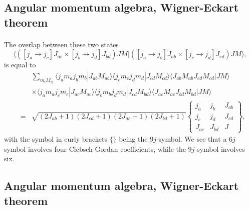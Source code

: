 \documentclass[%
twoside,                 %
final,                   %
10pt]{article}
\begin{document}
\subsection{Angular momentum algebra, Wigner-Eckart theorem}

\paragraph{}
The overlap between these two states
\[
\langle([j_a\rightarrow j_c]J_{ac}\times [j_b\rightarrow j_d]J_{bd}) JM| ([j_a\rightarrow j_b]J_{ab}\times [j_c\rightarrow j_d]J_{cd}) JM\rangle, 
\]
is equal to 
\begin{eqnarray}
\nonumber
& & \sum_{m_iM_{ij}}\langle j_am_aj_bm_b|J_{ab}M_{ab}\rangle \langle j_cm_cj_dm_d|J_{cd}M_{cd}\rangle \langle J_{ab}M_{ab}J_{cd}M_{cd}|JM\rangle \\
& & \times\langle j_am_aj_cm_c|J_{ac}M_{ac}\rangle \langle j_bm_bj_dm_d|J_{cd}M_{bd}\rangle \langle J_{ac}M_{ac}J_{bd}M_{bd}|JM\rangle \\  \nonumber
&= & \sqrt{(2J_{ab}+1)(2J_{cd}+1)(2J_{ac}+1)(2J_{bd}+1)}\left\{\begin{array}{ccc} j_a & j_b& J_{ab} \\ j_c & j_d& J_{cd} \\J_{ac} & J_{bd}& J\end{array}\right\}
, \nonumber
\end{eqnarray}
with the symbol in curly brackets $\{\}$ being the $9j$-symbol. We see  that a $6j$ symbol  involves four Clebsch-Gordan coefficients, while the $9j$ symbol
involves six.



\subsection{Angular momentum algebra, Wigner-Eckart theorem}

\end{document}
